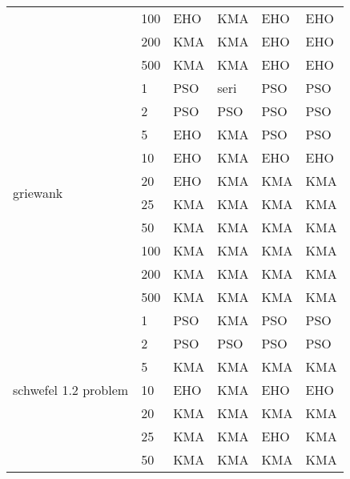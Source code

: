 \begin{longtable}[c]{|p{3.5cm}|l|l|l|l|l|}
                                       & 100       & EHO & KMA  & EHO   & EHO \\ \cline{2-6} 
                                       & 200       & KMA & KMA  & EHO   & EHO \\ \cline{2-6} 
                                       & 500       & KMA & KMA  & EHO   & EHO \\ \hline
\multirow[t]{10}{*}{griewank}             & 1         & PSO & seri & PSO   & PSO \\ \cline{2-6} 
                                       & 2         & PSO & PSO  & PSO   & PSO \\ \cline{2-6} 
                                       & 5         & EHO & KMA  & PSO   & PSO \\ \cline{2-6} 
                                       & 10        & EHO & KMA  & EHO   & EHO \\ \cline{2-6} 
                                       & 20        & EHO & KMA  & KMA   & KMA \\ \cline{2-6} 
                                       & 25        & KMA & KMA  & KMA   & KMA \\ \cline{2-6} 
                                       & 50        & KMA & KMA  & KMA   & KMA \\ \cline{2-6} 
                                       & 100       & KMA & KMA  & KMA   & KMA \\ \cline{2-6} 
                                       & 200       & KMA & KMA  & KMA   & KMA \\ \cline{2-6} 
                                       & 500       & KMA & KMA  & KMA   & KMA \\ \hline
\multirow[t]{10}{*}{schwefel 1.2 problem} & 1         & PSO & KMA  & PSO   & PSO \\ \cline{2-6} 
                                       & 2         & PSO & PSO  & PSO   & PSO \\ \cline{2-6} 
                                       & 5         & KMA & KMA  & KMA   & KMA \\ \cline{2-6} 
                                       & 10        & EHO & KMA  & EHO   & EHO \\ \cline{2-6} 
                                       & 20        & KMA & KMA  & KMA   & KMA \\ \cline{2-6} 
                                       & 25        & KMA & KMA  & EHO   & KMA \\ \cline{2-6} 
                                       & 50        & KMA & KMA  & KMA   & KMA \\ \cline{2-6} 

\end{longtable}
